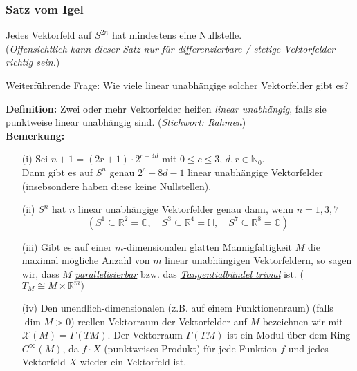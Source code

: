 \documentclass[fleqn, 12pt, letterpaper]{article}
\begin{document}
\noindent
\subsubsection*{Satz vom Igel}
Jedes Vektorfeld auf \( S^{2n} \) hat mindestens eine Nullstelle. \\
(\emph{Offensichtlich kann dieser Satz nur für differenzierbare / stetige Vektorfelder richtig sein.})

\vspace{1em}

\noindent
\colorbox{blue!20}{{Weiterführende Frage:}}
Wie viele linear unabhängige solcher Vektorfelder gibt es?

\vspace{1em}

\noindent
\textbf{Definition:}
Zwei oder mehr Vektorfelder heißen \emph{linear unabhängig}, falls sie punktweise linear unabhängig sind. (\emph{Stichwort: Rahmen})\\

\textbf{Bemerkung:}
\begin{itemize}
  \item[(i)] Sei \( n+1 = (2r+1) \cdot 2^{c+4d} \) mit \( 0 \leq c \leq 3 \), \( d, r \in \mathbb{N}_0 \). \\
  Dann gibt es auf \( S^n \) genau \( 2^c + 8d - 1 \) linear unabhängige Vektorfelder (insebsondere haben diese keine Nullstellen).

  \item[(ii)] \( S^n \) hat \( n \) linear unabhängige Vektorfelder genau dann, wenn \( n = 1, 3, 7 \)
  \[
  \left( S^1 \subseteq \mathbb{R}^2 = \mathbb{C}, \quad S^3 \subseteq \mathbb{R}^4 = \mathbb{H}, \quad S^7 \subseteq \mathbb{R}^8 = \mathbb{O} \right)
  \]

  \item[(iii)] Gibt es auf einer \( m \)-dimensionalen glatten Mannigfaltigkeit \( M \) die maximal mögliche Anzahl von \( m \) linear unabhängigen Vektorfeldern, so sagen wir, dass \( M \) \emph{\underline{parallelisierbar}} bzw. das \emph{\underline{Tangentialbündel trivial}} ist. ($T_M\cong M\times \mathbb{R}^m)$

  \item[(iv)] Den unendlich-dimensionalen (z.B. auf einem Funktionenraum) (falls \( \dim M > 0 \)) reellen Vektorraum der Vektorfelder auf \( M \) bezeichnen wir mit \( \mathcal{X}(M) = \Gamma(TM) \). Der Vektorraum \( \Gamma(TM) \) ist ein Modul über dem Ring \( C^\infty(M) \), da \( f\cdot X \) (punktweises Produkt) für jede Funktion \( f \) und jedes Vektorfeld \( X \) wieder ein Vektorfeld ist.
\end{itemize}
\end{document}
